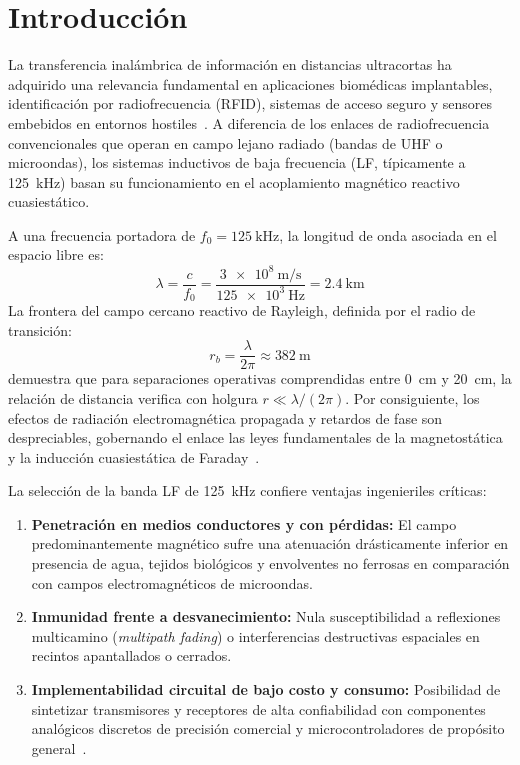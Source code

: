 \section{Introducción}
\label{sec:introduccion}

La transferencia inalámbrica de información en distancias ultracortas ha adquirido una relevancia fundamental en aplicaciones biomédicas implantables, identificación por radiofrecuencia (RFID), sistemas de acceso seguro y sensores embebidos en entornos hostiles~\cite{finkenzeller2010rfid}. A diferencia de los enlaces de radiofrecuencia convencionales que operan en campo lejano radiado (bandas de UHF o microondas), los sistemas inductivos de baja frecuencia (LF, típicamente a \SI{125}{\kilo\hertz}) basan su funcionamiento en el acoplamiento magnético reactivo cuasiestático.

A una frecuencia portadora de $f_0 = \SI{125}{\kilo\hertz}$, la longitud de onda asociada en el espacio libre es:
\begin{equation}
    \lambda = \frac{c}{f_0} = \frac{\SI{3e8}{\meter\per\second}}{\SI{125e3}{\hertz}} = \SI{2.4}{\kilo\meter}
    \label{eq:longitud_onda}
\end{equation}
La frontera del campo cercano reactivo de Rayleigh, definida por el radio de transición:
\begin{equation}
    r_b = \frac{\lambda}{2\pi} \approx \SI{382}{\meter}
    \label{eq:frontera_rayleigh}
\end{equation}
demuestra que para separaciones operativas comprendidas entre \SI{0}{\centi\meter} y \SI{20}{\centi\meter}, la relación de distancia verifica con holgura $r \ll \lambda / (2\pi)$. Por consiguiente, los efectos de radiación electromagnética propagada y retardos de fase son despreciables, gobernando el enlace las leyes fundamentales de la magnetostática y la inducción cuasiestática de Faraday~\cite{hayt2012electromagnetics,sadiku2018electromagnetics}.

La selección de la banda LF de \SI{125}{\kilo\hertz} confiere ventajas ingenieriles críticas:
\begin{enumerate}
    \item \textbf{Penetración en medios conductores y con pérdidas:} El campo predominantemente magnético sufre una atenuación drásticamente inferior en presencia de agua, tejidos biológicos y envolventes no ferrosas en comparación con campos electromagnéticos de microondas.
    \item \textbf{Inmunidad frente a desvanecimiento:} Nula susceptibilidad a reflexiones multicamino (\textit{multipath fading}) o interferencias destructivas espaciales en recintos apantallados o cerrados.
    \item \textbf{Implementabilidad circuital de bajo costo y consumo:} Posibilidad de sintetizar transmisores y receptores de alta confiabilidad con componentes analógicos discretos de precisión comercial y microcontroladores de propósito general~\cite{microchip2004microid}.
\end{enumerate}

